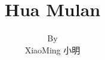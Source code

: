 \documentclass[oneside]{book}
\title{\Huge Hua Mulan}
\author{By \\ XiaoMing 小明}
\date{}
\begin{document}
	\begin{CJK}{UTF8}{gbsn}
		\maketitle
		\tableofcontents
		
	\end{CJK}
\end{document}

